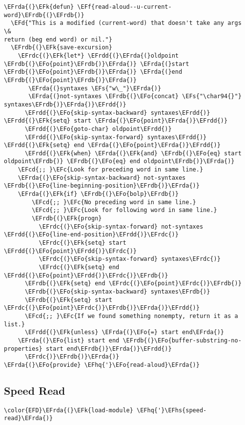 \documentclass[a4wide,10pt]{article}
\newcommand{\EFc}[1]{\textcolor{EFc}{#1}} %
\newcommand{\EFcd}[1]{\textcolor{EFcd}{#1}} %
\newcommand{\EFs}[1]{\textcolor{EFs}{#1}} %
\newcommand{\EFd}[1]{\textcolor{EFd}{#1}} %
\newcommand{\EFk}[1]{\textcolor{EFk}{#1}} %
\newcommand{\EFf}[1]{\textcolor{EFf}{#1}} %
\newcommand{\EFo}[1]{\textcolor{EFo}{#1}} %
\newcommand{\EFhq}[1]{\textcolor{EFhq}{#1}} %
\newcommand{\EFhs}[1]{\textcolor{EFhs}{#1}} %
\newcommand{\EFrda}[1]{\textcolor{EFrda}{#1}} %
\newcommand{\EFrdb}[1]{\textcolor{EFrdb}{#1}} %
\newcommand{\EFrdc}[1]{\textcolor{EFrdc}{#1}} %
\newcommand{\EFrdd}[1]{\textcolor{EFrdd}{#1}} %
\begin{document}
\begin{Code}
\begin{Verbatim}
\EFrda{(}\EFk{defun} \EFf{read-aloud--u-current-word}\EFrdb{(}\EFrdb{)}
  \EFd{"This is a modified (current-word) that doesn't take any args \&
return (beg end word) or nil."}
  \EFrdb{(}\EFk{save-excursion}
    \EFrdc{(}\EFk{let*} \EFrdd{(}\EFrda{(}oldpoint \EFrdb{(}\EFo{point}\EFrdb{)}\EFrda{)} \EFrda{(}start \EFrdb{(}\EFo{point}\EFrdb{)}\EFrda{)} \EFrda{(}end \EFrdb{(}\EFo{point}\EFrdb{)}\EFrda{)}
	   \EFrda{(}syntaxes \EFs{"w\_"}\EFrda{)}
	   \EFrda{(}not-syntaxes \EFrdb{(}\EFo{concat} \EFs{"\char94{}"} syntaxes\EFrdb{)}\EFrda{)}\EFrdd{)}
      \EFrdd{(}\EFo{skip-syntax-backward} syntaxes\EFrdd{)} \EFrdd{(}\EFk{setq} start \EFrda{(}\EFo{point}\EFrda{)}\EFrdd{)}
      \EFrdd{(}\EFo{goto-char} oldpoint\EFrdd{)}
      \EFrdd{(}\EFo{skip-syntax-forward} syntaxes\EFrdd{)} \EFrdd{(}\EFk{setq} end \EFrda{(}\EFo{point}\EFrda{)}\EFrdd{)}
      \EFrdd{(}\EFk{when} \EFrda{(}\EFk{and} \EFrdb{(}\EFo{eq} start oldpoint\EFrdb{)} \EFrdb{(}\EFo{eq} end oldpoint\EFrdb{)}\EFrda{)}
	\EFcd{;; }\EFc{Look for preceding word in same line.}
	\EFrda{(}\EFo{skip-syntax-backward} not-syntaxes \EFrdb{(}\EFo{line-beginning-position}\EFrdb{)}\EFrda{)}
	\EFrda{(}\EFk{if} \EFrdb{(}\EFo{bolp}\EFrdb{)}
	    \EFcd{;; }\EFc{No preceding word in same line.}
	    \EFcd{;; }\EFc{Look for following word in same line.}
	    \EFrdb{(}\EFk{progn}
	      \EFrdc{(}\EFo{skip-syntax-forward} not-syntaxes \EFrdd{(}\EFo{line-end-position}\EFrdd{)}\EFrdc{)}
	      \EFrdc{(}\EFk{setq} start \EFrdd{(}\EFo{point}\EFrdd{)}\EFrdc{)}
	      \EFrdc{(}\EFo{skip-syntax-forward} syntaxes\EFrdc{)}
	      \EFrdc{(}\EFk{setq} end \EFrdd{(}\EFo{point}\EFrdd{)}\EFrdc{)}\EFrdb{)}
	  \EFrdb{(}\EFk{setq} end \EFrdc{(}\EFo{point}\EFrdc{)}\EFrdb{)}
	  \EFrdb{(}\EFo{skip-syntax-backward} syntaxes\EFrdb{)}
	  \EFrdb{(}\EFk{setq} start \EFrdc{(}\EFo{point}\EFrdc{)}\EFrdb{)}\EFrda{)}\EFrdd{)}
      \EFcd{;; }\EFc{If we found something nonempty, return it as a list.}
      \EFrdd{(}\EFk{unless} \EFrda{(}\EFo{=} start end\EFrda{)}
	\EFrda{(}\EFo{list} start end \EFrdb{(}\EFo{buffer-substring-no-properties} start end\EFrdb{)}\EFrda{)}\EFrdd{)}
      \EFrdc{)}\EFrdb{)}\EFrda{)}
\EFrda{(}\EFo{provide} \EFhq{'}\EFo{read-aloud}\EFrda{)}
\end{Verbatim}
\end{Code}

\subsection{Speed Read}
\label{sec:org5c050cf}
\begin{Code}
\begin{Verbatim}
\color{EFD}\EFrda{(}\EFk{load-module} \EFhq{'}\EFhs{speed-read}\EFrda{)}
\end{Verbatim}
\end{Code}
\end{document}
